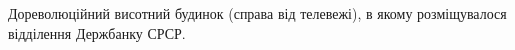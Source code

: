  
 
 
 
 

Дореволюційний висотний будинок (справа від телевежі), в якому розміщувалося
відділення Держбанку СРСР.
